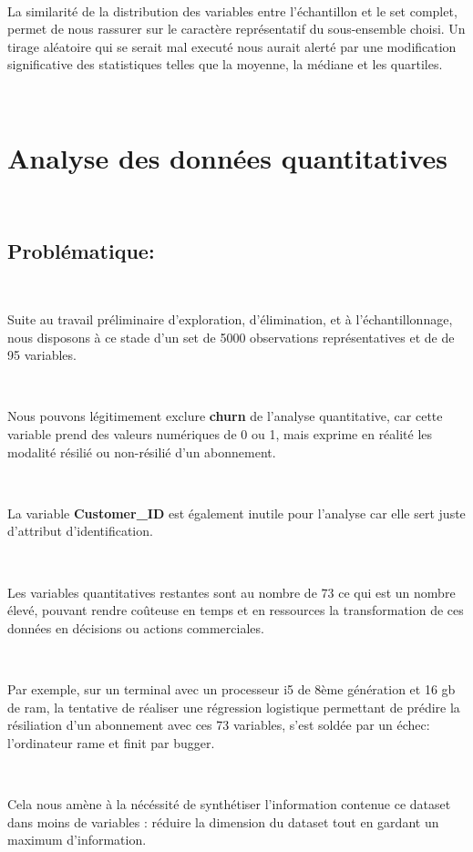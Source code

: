 \documentclass[]{imsart}
\numberwithin{equation}{section}
\theoremstyle{plain}
\begin{document}
~

La similarité de la distribution des variables entre l'échantillon et le set complet, permet de nous rassurer sur le caractère représentatif du sous-ensemble choisi. Un tirage aléatoire qui se serait mal executé nous aurait alerté par une modification significative des statistiques telles que la moyenne, la médiane et les quartiles.

~

\hypertarget{analyse-des-donnuxe9es-quantitatives}{%
\section{Analyse des données quantitatives}\label{analyse-des-donnuxe9es-quantitatives}}

~

\hypertarget{probluxe9matique}{%
\subsection{Problématique:}\label{probluxe9matique}}

~

Suite au travail préliminaire d'exploration, d'élimination, et à l'échantillonnage, nous disposons à ce stade d'un set de 5000 observations représentatives et de de 95 variables.

~

Nous pouvons légitimement exclure \textbf{churn} de l'analyse quantitative, car cette variable prend des valeurs numériques de 0 ou 1, mais exprime en réalité les modalité résilié ou non-résilié d'un abonnement.

~

La variable \textbf{Customer\_ID} est également inutile pour l'analyse car elle sert juste d'attribut d'identification.

~

Les variables quantitatives restantes sont au nombre de 73 ce qui est un nombre élevé, pouvant rendre coûteuse en temps et en ressources la transformation de ces données en décisions ou actions commerciales.

~

Par exemple, sur un terminal avec un processeur i5 de 8ème génération et 16 gb de ram, la tentative de réaliser une régression logistique permettant de prédire la résiliation d'un abonnement avec ces 73 variables, s'est soldée par un échec: l'ordinateur rame et finit par bugger.

~

Cela nous amène à la nécéssité de synthétiser l'information contenue ce dataset dans moins de variables : réduire la dimension du dataset tout en gardant un maximum d'information.
\end{document}
